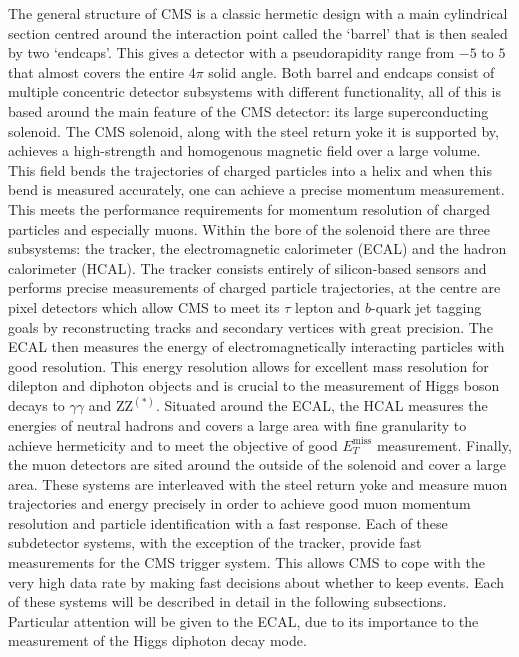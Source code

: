 The general structure of CMS is a classic hermetic design with a main cylindrical section centred around the interaction point called the `barrel' that is then sealed by two `endcaps'. This gives a detector with a pseudorapidity range from $-5$ to $5$ that almost covers the entire $4\pi$ solid angle. Both barrel and endcaps consist of multiple concentric detector subsystems with different functionality, all of this is based around the main feature of the CMS detector: its large superconducting solenoid. 
The CMS solenoid, along with the steel return yoke it is supported by, achieves a high-strength and homogenous magnetic field over a large volume. This field bends the trajectories of charged particles into a helix and when this bend is measured accurately, one can achieve a precise momentum measurement. This meets the performance requirements for momentum resolution of charged particles and especially muons. Within the bore of the solenoid there are three subsystems: the tracker, the electromagnetic calorimeter (ECAL) and the hadron calorimeter (HCAL). The tracker consists entirely of silicon-based sensors and performs precise measurements of charged particle trajectories, at the centre are pixel detectors which allow CMS to meet its $\tau$ lepton and $b$-quark jet tagging goals by reconstructing tracks and secondary vertices with great precision. 
The ECAL then measures the energy of electromagnetically interacting particles with good resolution. This energy resolution allows for excellent mass resolution for dilepton and diphoton objects and is crucial to the measurement of Higgs boson decays to $\gamma\gamma$ and $\mathrm{ZZ}^{(*)}$.
Situated around the ECAL, the HCAL measures the energies of neutral hadrons and covers a large area with fine granularity to achieve hermeticity and to meet the objective of good $E_{T}^{\mathrm{miss}}$ measurement.
Finally, the muon detectors are sited around the outside of the solenoid and cover a large area. These systems are interleaved with the steel return yoke and measure muon trajectories and energy precisely in order to achieve good muon momentum resolution and particle identification with a fast response. 
Each of these subdetector systems, with the exception of the tracker, provide fast measurements for the CMS trigger system. This allows CMS to cope with the very high data rate by making fast decisions about whether to keep events.
Each of these systems will be described in detail in the following subsections. Particular attention will be given to the ECAL, due to its importance to the measurement of the Higgs diphoton decay mode. 


